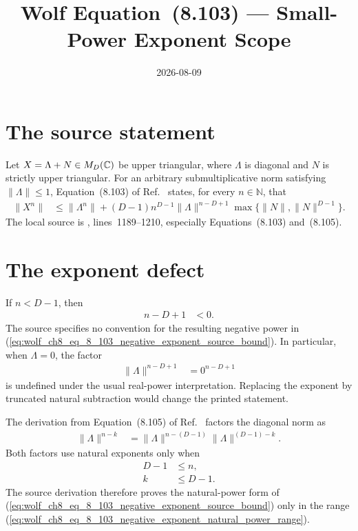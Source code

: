 \documentclass{article}
\title{Wolf Equation~(8.103) --- Small-Power Exponent Scope}
\author{}
\date{2026-08-09}
\begin{document}
\maketitle
{}

\section{The source statement}

Let $X=\Lambda+N\in M_D(\mathbb{C})$ be upper triangular, where $\Lambda$ is diagonal
and $N$ is strictly upper triangular. For an arbitrary submultiplicative norm
satisfying $\lVert\Lambda\rVert\leq1$, Equation~(8.103) of
Ref.~\cite{Wolf2012Quantum} states, for every $n\in\mathbb N$, that
\begin{align}
    \lVert X^n\rVert
        &\leq \lVert\Lambda^n\rVert
        +(D-1)n^{D-1}\lVert\Lambda\rVert^{n-D+1}
        \max\bigl\{\lVert N\rVert,\lVert N\rVert^{D-1}\bigr\}.
    \label{eq:wolf_ch8_eq_8_103_negative_exponent_source_bound}
\end{align}
The local source is
,
lines~1189--1210, especially Equations~(8.103) and~(8.105).

\section{The exponent defect}

If $n<D-1$, then
\begin{align}
    n-D+1
        &<0.
    \label{eq:wolf_ch8_eq_8_103_negative_exponent_negative_exponent_condition}
\end{align}
The source specifies no convention for the resulting negative power in
(\ref{eq:wolf_ch8_eq_8_103_negative_exponent_source_bound}). In particular,
when $\Lambda=0$, the factor
\begin{align}
    \lVert\Lambda\rVert^{n-D+1}
        &=0^{n-D+1}
    \label{eq:wolf_ch8_eq_8_103_negative_exponent_zero_negative_power}
\end{align}
is undefined under the usual real-power interpretation. Replacing the
exponent by truncated natural subtraction would change the printed statement.

The derivation from Equation~(8.105) of Ref.~\cite{Wolf2012Quantum} factors
the diagonal norm as
\begin{align}
    \lVert\Lambda\rVert^{n-k}
        &=
        \lVert\Lambda\rVert^{n-(D-1)}
        \lVert\Lambda\rVert^{(D-1)-k}.
    \label{eq:wolf_ch8_eq_8_103_negative_exponent_source_factorization}
\end{align}
Both factors use natural exponents only when
\begin{align}
    D-1
        &\leq n,
    \label{eq:wolf_ch8_eq_8_103_negative_exponent_natural_power_range}\\
    k
        &\leq D-1.
    \label{eq:wolf_ch8_eq_8_103_negative_exponent_nilpotent_word_range}
\end{align}
The source derivation therefore proves the natural-power form of
(\ref{eq:wolf_ch8_eq_8_103_negative_exponent_source_bound}) only in the
range
(\ref{eq:wolf_ch8_eq_8_103_negative_exponent_natural_power_range}).
\end{document}
